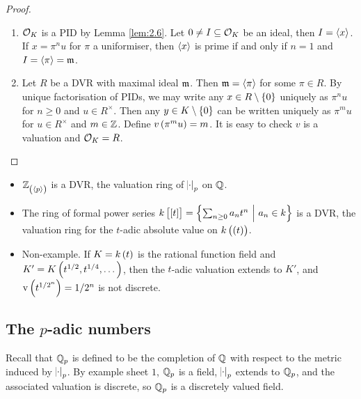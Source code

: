 \begin{proof}
\hfill
\begin{enumerate}
\item $ \mathcal{O}_K $ is a PID by Lemma \ref{lem:2.6}. Let $ 0 \ne I \subseteq \mathcal{O}_K $ be an ideal, then $ I = \left\langle x \right\rangle $. If $ x = \pi^nu $ for $ \pi $ a uniformiser, then $ \left\langle x \right\rangle $ is prime if and only if $ n = 1 $ and $ I = \left\langle \pi \right\rangle = \mathfrak{m} $.
\item Let $ R $ be a DVR with maximal ideal $ \mathfrak{m} $. Then $ \mathfrak{m} = \left\langle \pi \right\rangle $ for some $ \pi \in R $. By unique factorisation of PIDs, we may write any $ x \in R \setminus \cbr{0} $ uniquely as $ \pi^nu $ for $ n \ge 0 $ and $ u \in R^\times $. Then any $ y \in K \setminus \cbr{0} $ can be written uniquely as $ \pi^mu $ for $ u \in R^\times $ and $ m \in \mathbb{Z} $. Define $ v\br{\pi^mu} = m $. It is easy to check $ v $ is a valuation and $ \mathcal{O}_K = R $.
\end{enumerate}
\end{proof}

\begin{example*}
\hfill
\begin{itemize}
\item $ \ZZ_{\br{\abr{p}}} $ is a DVR, the valuation ring of $ \abs{\cdot}_p $ on $ \mathbb{Q} $.
\item The ring of formal power series $ k\sbr{\sbr{t}} = \cbr{\sum_{n \ge 0} a_nt^n \st a_n \in k} $ is a DVR, the valuation ring for the $ t $-adic absolute value on $ k\br{\br{t}} $.
\item Non-example. If $ K = k\br{t} $ is the rational function field and $ K' = K\br{t^{1 / 2}, t^{1 / 4}, \dots} $, then the $ t $-adic valuation extends to $ K' $, and $ \v\br{t^{1 / 2^n}} = 1 / 2^n $ is not discrete.
\end{itemize}
\end{example*}

\pagebreak

\subsection{The \texorpdfstring{$ p $}{p}-adic numbers}


Recall that $ \mathbb{Q}_p $ is defined to be the completion of $ \mathbb{Q} $ with respect to the metric induced by $ \abs{\cdot}_p $. By example sheet $ 1 $, $ \mathbb{Q}_p $ is a field, $ \abs{\cdot}_p $ extends to $ \mathbb{Q}_p $, and the associated valuation is discrete, so $ \mathbb{Q}_p $ is a discretely valued field.

